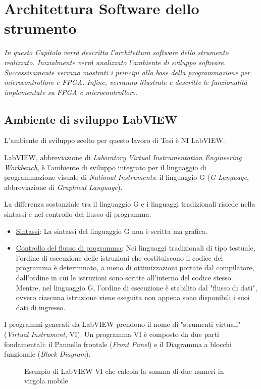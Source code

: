 \chapter{Architettura Software dello strumento}
\label{capitolo4}
\thispagestyle{empty}

\textit{In questo Capitolo verrà descritta l'architettura software dello strumento realizzato. Inizialmente verrà analizzato l'ambiente di sviluppo software. Successivamente verrano mostrati i principi alla base della programmazione per microcontrollore e FPGA. Infine, verranno illustrate e descritte le funzionalità implementate su FPGA e microcontrollore.}

\section{Ambiente di sviluppo LabVIEW}
L'ambiente di sviluppo scelto per questo lavoro di Tesi è NI LabVIEW.

LabVIEW, abbreviazione di \textit{Laboratory Virtual Instrumentation Engineering Workbench}, è l'ambiente di sviluppo integrato per il linguaggio di programmazione visuale di \textit{National Instruments}: il linguaggio G (\textit{G-Language}, abbreviazione di \textit{Graphical Language}).

La differenza sostanziale tra il linguaggio G e i linguaggi tradizionali risiede nella sintassi e nel controllo del flusso di programma:
\begin{itemize}
	\item \underline{Sintassi}: La sintassi del linguaggio G non è scritta ma grafica. 
	\item \underline{Controllo del flusso di programma}: Nei linguaggi tradizionali di tipo testuale, l'ordine di esecuzione delle istruzioni che costituiscono il codice del programma è determinato, a meno di ottimizzazioni portate dal compilatore, dall'ordine in cui le istruzioni sono scritte all'interno del codice stesso. Mentre, nel linguaggio G, l'ordine di esecuzione è stabilito dal "flusso di dati", ovvero ciascuna istruzione viene eseguita non appena sono disponibili i suoi dati di ingresso.
\end{itemize}

I programmi generati da LabVIEW prendono il nome di "strumenti virtuali" (\textit{Virtual Instrument}, VI). Un programma VI è composto da due parti fondamentali: il Pannello frontale (\textit{Front Panel}) e il Diagramma a blocchi funzionale (\textit{Block Diagram}).

\begin{figure}[H]
\centering
{}
\hspace{5mm}
\caption{Esempio di LabVIEW VI che calcola la somma di due numeri in virgola mobile}\label{esempiolv}
\end{figure}

